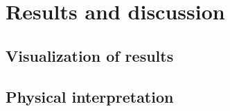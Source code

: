 \section{Results and discussion}

\subsection{Visualization of results}

\subsection{Physical interpretation}
